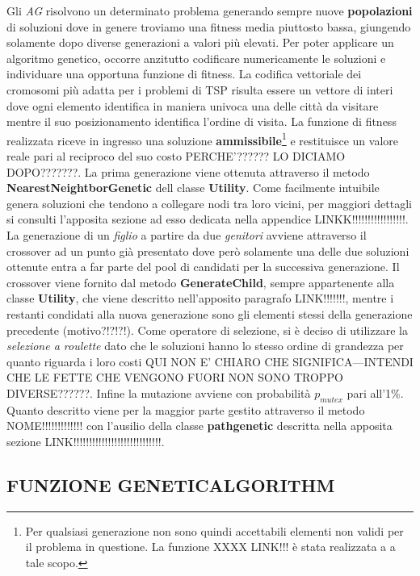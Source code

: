 \documentclass[11pt]{article}
\begin{document}
Gli \textit{AG} risolvono un determinato problema generando sempre nuove \textbf{popolazioni} di soluzioni dove in genere troviamo una fitness media piuttosto bassa, giungendo solamente dopo diverse generazioni a valori più elevati. Per poter applicare un algoritmo genetico, occorre anzitutto codificare numericamente le soluzioni e individuare una opportuna funzione di fitness. La codifica vettoriale dei cromosomi più adatta per i problemi di TSP risulta essere un vettore di interi dove ogni elemento identifica in maniera univoca una delle città da visitare mentre il suo posizionamento identifica l'ordine di visita.
La funzione di fitness realizzata riceve in ingresso una soluzione \textbf{ammissibile}\footnote{Per qualsiasi generazione non sono quindi accettabili elementi non validi per il problema in questione. La funzione XXXX LINK!!! è stata realizzata a a tale scopo.} e restituisce un valore reale pari al reciproco del suo costo PERCHE'?????? LO DICIAMO DOPO???????.
La prima generazione viene ottenuta attraverso il metodo \textbf{NearestNeightborGenetic} dell classe \textbf{Utility}. Come facilmente intuibile genera soluzioni che tendono a collegare nodi tra loro vicini, per maggiori dettagli si consulti l'apposita sezione ad esso dedicata nella appendice LINKK!!!!!!!!!!!!!!!!!.
La generazione di un \textit{figlio} a partire da due \textit{genitori} avviene attraverso il crossover ad un punto già presentato dove però solamente una delle due soluzioni ottenute entra a far parte del pool di candidati per la successiva generazione. Il crossover viene fornito dal metodo \textbf{GenerateChild}, sempre appartenente alla classe \textbf{Utility}, che viene descritto nell'apposito paragrafo LINK!!!!!!!, mentre i restanti condidati alla nuova generazione sono gli elementi stessi della generazione precedente (motivo?!?!?!).
Come operatore di selezione, si è deciso di utilizzare la \textit{selezione a roulette} dato che le soluzioni hanno lo stesso ordine di grandezza per quanto riguarda i loro costi QUI NON E' CHIARO CHE SIGNIFICA---INTENDI CHE LE FETTE CHE VENGONO FUORI NON SONO TROPPO DIVERSE??????. Infine la mutazione avviene con probabilità $p_{mutex}$ pari all'1\%.
Quanto descritto viene per la maggior parte gestito attraverso il metodo NOME!!!!!!!!!!!!! con l'ausilio della classe \textbf{pathgenetic} descritta nella apposita sezione LINK!!!!!!!!!!!!!!!!!!!!!!!!!!!!.

\subsection*{FUNZIONE GENETICALGORITHM}
\label{sec:FunzioneGenAlgS}
\end{document}
